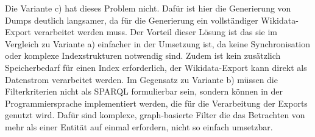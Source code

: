Die Variante c) hat dieses Problem nicht.
Dafür ist hier die Generierung von Dumps deutlich langsamer, da für die Generierung ein vollständiger Wikidata-Export verarbeitet werden muss.
Der Vorteil dieser Lösung ist das sie im Vergleich zu Variante a) einfacher in der Umsetzung ist, da keine Synchronisation oder komplexe Indexstrukturen notwendig sind.
Zudem ist kein zusätzlich Speicherbedarf für einen Index erforderlich, der Wikidata-Export kann direkt als Datenstrom verarbeitet werden.
Im Gegensatz zu Variante b) müssen die Filterkriterien nicht als SPARQL formulierbar sein, sondern können in der Programmiersprache implementiert werden, die für die Verarbeitung der Exports genutzt wird.
Dafür sind komplexe, graph-basierte Filter die das Betrachten von mehr als einer Entität auf einmal erfordern, nicht so einfach umsetzbar.

